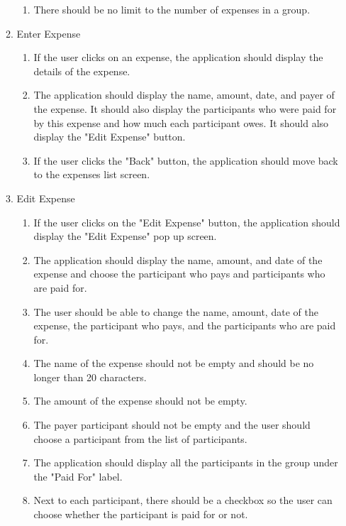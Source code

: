 \documentclass[conference]{IEEEtran}
\begin{document}
\begin{enumerate}
\begin{enumerate}
\begin{enumerate}
                        \item There should be no limit to the number of expenses in a group.
                    \end{enumerate}
                \item Enter Expense
                    \begin{enumerate}
                        \item If the user clicks on an expense, the application should display the details of the expense.
                        \item The application should display the name, amount, date, and payer of the expense. It should also display the participants who were paid for by this expense and how much each participant owes. It should also display the "Edit Expense" button.
                        \item If the user clicks the "Back" button, the application should move back to the expenses list screen.
                    \end{enumerate}
                \item Edit Expense
                    \begin{enumerate}
                        \item If the user clicks on the "Edit Expense" button, the application should display the "Edit Expense" pop up screen.
                        \item The application should display the name, amount, and date of the expense and choose the participant who pays and participants who are paid for.
                        \item The user should be able to change the name, amount, date of the expense, the participant who pays, and the participants who are paid for.
                        \item The name of the expense should not be empty and should be no longer than 20 characters.
                        \item The amount of the expense should not be empty.
                        \item The payer participant should not be empty and the user should choose a participant from the list of participants.
                        \item The application should display all the participants in the group under the "Paid For" label.
                        \item Next to each participant, there should be a checkbox so the user can choose whether the participant is paid for or not.

\end{enumerate}
\end{enumerate}
\end{enumerate}
\end{document}
